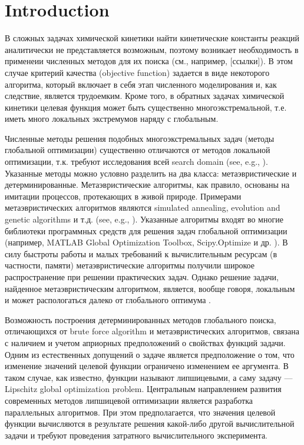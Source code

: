 \documentclass[mathematics,article,submit,pdftex,moreauthors]{Definitions/mdpi}
\begin{document}
\section{Introduction}


В сложных задачах химической кинетики найти кинетические константы реакций аналитически не представляется возможным, поэтому возникает необходимость в применеии численных методов для их поиска (см., например, [ссылки]). В этом случае критерий качества (objective function) задается в виде некоторого алгоритма, который включает в себя этап численного моделирования и, как следствие, является трудоемким. Кроме того, в обратных задачах химической кинетики целевая функция может быть существенно многоэкстремальной, т.е. иметь много локальных экстремумов наряду с глобальным. 

Численные методы решения подобных многоэкстремальных задач (методы глобальной оптимизации) существенно отличаются от методов локальной оптимизации, т.к. требуют исследования всей search domain (see, e.g., \cite{PaulaviciusZilinskas2014,Sergeyev2017}). Указанные методы можно условно разделить на два класса: метаэвристические и детерминированные. Метаэвристические алгоритмы, как правило, основаны на имитации процессов, протекающих в живой природе.
Примерами метаэвристических алгоритмов являются simulated annealing, evolution and genetic algorithms и т.д. (see, e.g., \cite{Battiti2009,Eiben2015}).
Указанные алгоритмы входят во многие библиотеки программных средств для решения задач глобальной оптимизации (например, MATLAB Global Optimization Toolbox, Scipy.Optimize и др. ).
В силу быстроты работы и малых требований к вычислительным ресурсам (в частности, памяти) метаэвристические алгоритмы получили широкое распространение при решении практических задач.  Однако решение задачи, найденное метаэвристическим алгоритмом, является, вообще говоря, локальным и может распологаться далеко от глобального оптимума \cite{Kvasov2018}. 

Возможность построения детерминированных методов глобального поиска, отличающихся от brute force algorithm и метаэвристических алгоритмов, связана с наличием и учетом  априорных предположений о свойствах функций задачи. 
Одним из естественных допущений о задаче является предположение о том, что изменение значений целевой функции ограничено изменением ее аргумента. В таком случае, как известно, функции называют липшицевыми, а саму задачу --- Lipschitz global optimization problem. Центральным направлением развития современных методов липшицевой оптимизации является разработка параллельных алгоритмов. При этом предполагается, что значения целевой функции вычисляются в результате решения какой-либо другой вычислительной задачи и требуют проведения затратного вычислительного эксперимента.
\end{document}
